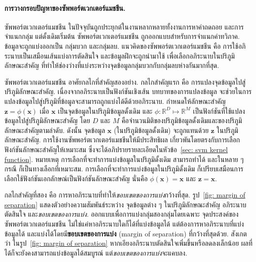 \paragraph{การวางกรอบปัญหาของซัพพอร์ตเวกเตอร์แมชชีน.} 
ซัพพอร์ตเวกเตอร์แมชชีน ในปัจจุบันถูกประยุกต์ในงานหลากหลายทั้งงานการหาค่าถดถอย และการจำแนกกลุ่ม
แต่ดั้งเดิมเริ่มต้น
ซัพพอร์ตเวกเตอร์แมชชีน ถูกออกแบบสำหรับการจำแนกค่าทวิภาค.
ข้อมูลจะถูกแบ่งออกเป็น กลุ่มบวก และกลุ่มลบ.
แนวคิดของซัพพอร์ตเวกเตอร์แมชชีน
คือ
การใช้อภิระนาบเป็นเสมือนเส้นแบ่งการตัดสินใจ
และข้อมูลฝึกจะถูกนำมาใช้ 
เพื่อเลือกอภิระนาบในปริภูมิลักษณะสำคัญ 
ที่ทำให้ช่องว่างที่แบ่งระหว่างจุดข้อมูลกลุ่มบวกกับกลุ่มลบห่างกันมากที่สุด.

ซัพพอร์ตเวกเตอร์แมชชีน อาศัยกลไกที่สำคัญสองอย่าง.
กลไกสำคัญแรก คือ การแปลงจุดข้อมูลไปสู่ปริภูมิลักษณะสำคัญ.
เนื่องจากอภิระนาบเป็นฟังก์ชันเชิงเส้น
บทบาทของการแปลงข้อมูล จะช่วยในการแปลงข้อมูลไปสู่ปริภูมิที่ข้อมูลจะสามารถถูกแบ่งได้ดีด้วยอภิระนาบ.
กำหนดให้ลักษณะสำคัญ $\bm{z} = \phi(\bm{x})$
เมื่อ $\bm{x}$ เป็นจุดข้อมูลในปริภูมิข้อมูลดั้งเดิม
และ $\phi: \mathbb{R}^D \mapsto \mathbb{R}^M$ เป็นฟังก์ชันที่ใช้แปลงข้อมูลไปสู่ปริภูมิลักษณะสำคัญ
โดย $D$ และ $M$ คือจำนวนมิติของปริภูมิข้อมูลดั้งเดิมและของปริภูมิลักษณะสำคัญตามลำดับ.
ดังนั้น จุดข้อมูล $\bm{x}$ (ในปริภูมิข้อมูลดั้งเดิม) จะถูกแทนด้วย $\bm{z}$ ในปริภูมิลักษณะสำคัญ.
การใช้งานซัพพอร์ตเวกเตอร์แมชชีนให้มีประสิทธิผล เกี่ยวพันโดยตรงกับการเลือกฟังก์ชันลักษณะสำคัญให้เหมาะสม
ซึ่งจะได้อภิปรายรายละเอียดในหัวข้อ~\ref{sec: svm kernel function}.
หมายเหตุ
การเลือกที่จะทำการแบ่งข้อมูลในปริภูมิดั้งเดิม สามารถทำได้
และในหลาย ๆ กรณี ก็เป็นทางเลือกที่เหมาะสม.
การเลือกที่จะทำการแบ่งข้อมูลในปริภูมิดั้งเดิม
ก็เปรียบเสมือนการเลือกใช้ฟังก์ชันเอกลักษณ์เป็นฟังก์ชันลักษณะสำคัญ นั่นคือ $\phi(\bm{x}) = \bm{x}$ 
และ $\bm{z} = \bm{x}$.

กลไกสำคัญที่สอง คือ
การหาอภิระนาบที่ทำให้\textit{ขอบเขตของการแบ่ง}กว้างที่สุด.
รูป~\ref{fig: margin of separation}
แสดงตัวอย่างความสัมพันธ์ระหว่าง จุดข้อมูลต่าง ๆ ในปริภูมิลักษณะสำคัญ
อภิระนาบตัดสินใจ และ\textit{ขอบเขตของการแบ่ง}.
ออกแบบเพื่อการแบ่งกลุ่มสองกลุ่มโดยเฉพาะ
จุดประสงค์ของซัพพอร์ตเวกเตอร์แมชชีน
ไม่ใช่แค่หาอภิระนาบใดก็ได้ที่แบ่งข้อมูลได้
แต่ต้องการหาอภิระนาบที่แบ่งข้อมูลได้ และแบ่งได้โดยมี\textbf{ขอบเขตของการแบ่ง} (margin of separation)
ที่กว้างที่สุดด้วย.
สังเกตว่า ในรูป~\ref{fig: margin of separation}
หากเอียงอภิระนาบตัดสินใจเพิ่มขึ้นหรือลดลงเล็กน้อย
ผลที่ได้ก็จะยังคงสามารถแบ่งข้อมูลได้สมบูรณ์
แต่\textit{ขอบเขตของการแบ่ง}จะแคบลง.

